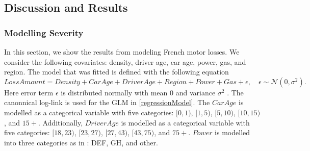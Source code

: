 \documentclass[11pt,letterpaper]{article}
\numberwithin{equation}{section}
\numberwithin{equation}{section}
\numberwithin{equation}{section}
\begin{document}
\subsection{Discussion and Results}
\subsubsection{Modelling Severity}
In this section, we show the results from modeling French motor losses. We consider the following covariates: density, driver age, car age, power, gas,  and region. %
The model that was fitted is defined with the following equation
\begin{equation}
Loss Amount =  Density + Car Age + Driver Age + Region + Power + Gas + \epsilon, \quad \epsilon \sim \mathcal{N}(0,\sigma^2). \label{regressionModel}
\end{equation}
Here error term $\epsilon$ is distributed normally with mean $0$ and variance $\sigma^2$ .
The canonnical log-link is used for the GLM in \eqref{regressionModel}. The
$CarAge$ is modelled as a categorical variable with five categories: $[0,1)$, $[1,5)$, $[5,10)$, $[10,15)$, and $15+$. Additionally, $DriverAge$ is modelled as a categorical variable with five categories: $[18,23)$, $[23,27)$, $[27,43)$, $[43,75)$, and $75+$. $Power$ is modelled into three categories as in \cite{Charpentier:2014}:
DEF, GH, and other.
\end{document}
